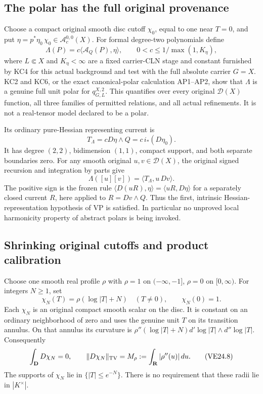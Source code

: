 \subsection{The polar has the full original provenance}

Choose a compact original smooth disc cutoff \(\chi_0\), equal
to one near \(T=0\), and put
\(\eta=p^*\eta_0\,\chi_0\in\mathcal A_c^{0,0}(X)\).
For formal degree-two polynomials define
\[
 \Lambda(P)=c\langle\mathcal A_Q(P),\eta\rangle,
 \qquad 0<c\le 1/\max(1,K_\eta),
 \tag{VE24.4}
\]
where \(L\Subset X\) and \(K_\eta<\infty\) are a fixed
carrier-CLN stage and constant furnished by KC4 for this actual
background and test with the full absolute carrier \(G=X\).
KC2 and KC6, or the exact canonical-polar calculation AP1--AP2,
show that \(\Lambda\) is a genuine full unit polar for
\(q^{X,2}_{G,L}\). This quantifies over every
original \(\mathcal D(X)\) function, all three families of
permitted relations, and all actual refinements. It is not a
real-tensor model declared to be a polar.

Its ordinary pure-Hessian representing current is
\[
 T_\Lambda=cD\eta\wedge Q=c\,i_*(D\eta_0).
 \tag{VE24.5}
\]
It has degree \((2,2)\), bidimension \((1,1)\), compact support,
and both separate boundaries zero. For any smooth original
\(u,v\in\mathcal D(X)\), the original signed recursion and
integration by parts give
\[
 \Lambda([u][v])
       =\langle T_\Lambda,u\,Dv\rangle.
 \tag{VE24.6}
\]
The positive sign is the frozen rule
\(\langle D(uR),\eta\rangle=\langle uR,D\eta\rangle\)
for a separately closed current \(R\), here applied to
\(R=Dv\wedge Q\). Thus the first, intrinsic Hessian-representation
hypothesis of VP is satisfied. In particular no unproved local
harmonicity property of abstract polars is being invoked.

\subsection{Shrinking original cutoffs and product calibration}

Choose one smooth real profile \(\rho\) with
\(\rho=1\) on \(( -\infty,-1]\), \(\rho=0\) on \([0,\infty)\).
For integers \(N\ge1\), set
\[
 \chi_N(T)=\rho(\log|T|+N)\quad(T\ne0),\qquad \chi_N(0)=1.
 \tag{VE24.7}
\]
Each \(\chi_N\) is an original compact smooth scalar on the
disc. It is constant on an ordinary neighborhood of zero and
uses the genuine unit \(T\) on its transition annulus. On that
annulus its curvature is
\(\rho''(\log|T|+N)d'\log|T|\wedge d''\log|T|\). Consequently
\[
 \int_{\mathbf D}D\chi_N=0,\qquad
 \|D\chi_N\|_{\rm TV}=M_\rho:=\int_{\mathbf R}|\rho''(u)|\,du.
 \tag{VE24.8}
\]
The supports of \(\chi_N\) lie in \(\{|T|\le e^{-N}\}\).
There is no requirement that these radii lie in \(|K^\times|\).

